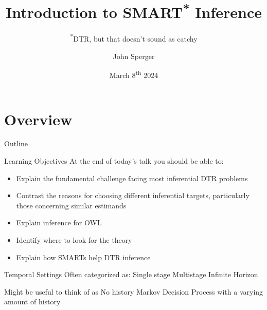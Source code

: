 \documentclass[aspectratio=169, professionalfonts]{beamer}
\author{John Sperger}
\date{March 8\textsuperscript{th} 2024}
\title{Introduction to SMART\textsuperscript{*} Inference}
\subtitle{\textsuperscript{*}DTR, but that doesn't sound as catchy}
\begin{document}
\maketitle

\section{Overview}
\begin{frame}{Outline}
	\tableofcontents[hideallsubsections]
\end{frame}

\begin{frame}[label={overview:objectives}]{Learning Objectives}
	At the end of today's talk you should be able to:
	\begin{itemize}
		\item Explain the fundamental challenge facing most inferential DTR problems
		\item Contrast the reasons for choosing different inferential targets,
		      particularly those concerning similar estimands
		\item Explain inference for OWL
		\item Identify where to look for the theory
		\item Explain how SMARTs help DTR inference
	\end{itemize}
	\vfill
\end{frame}

\begin{frame}[label={overview:time}]{Temporal Settings}
	Often categorized as:
	Single stage
	Multistage
	Infinite Horizon

	Might be useful to think of as
	No history
	Markov Decision Process with a varying amount of history

\end{frame}
\end{document}
